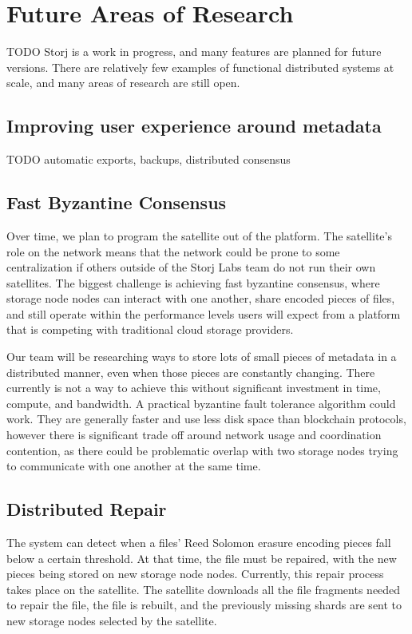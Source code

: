 \documentclass[a4paper,10pt]{article} \usepackage[utf8]{inputenc}
\newcommand{\todo}[1]{{\color{red} TODO #1 }}
\begin{document}
\section{Future Areas of Research}\label{sec:future_work}

\todo{ Storj is a work in progress, and many features are planned for future
versions. There are relatively few examples of functional distributed systems at
scale, and many areas of research are still open. }

\subsection{Improving user experience around metadata}

\todo{automatic exports, backups, distributed consensus}

\subsection{Fast Byzantine Consensus}

Over time, we plan to program the satellite out of the platform. 
The satellite's role on the network means that the network could be prone 
to some
centralization if others outside of the Storj Labs team do not run their own
satellites. The biggest challenge is achieving fast byzantine consensus,
where storage node nodes can interact with one another, share encoded pieces of 
files,
and still operate within the performance levels users will expect from a
platform that is competing with traditional cloud storage providers.

Our team will be researching ways to store lots of small pieces of metadata
in a distributed manner, even when those pieces are constantly changing. There
currently is not a way to achieve this without significant investment in time,
compute, and bandwidth. A practical byzantine fault tolerance algorithm could
work. They are generally faster and use less disk space than blockchain
protocols, however there is significant trade off around network usage and
coordination contention, as there could be problematic overlap with two storage 
nodes trying to communicate with one another at the same time.

\subsection{Distributed Repair}

The system can detect when a files' Reed Solomon erasure encoding pieces fall
below a certain threshold. At that time, the file must be repaired, with 
the new pieces being stored on new storage node nodes. 
Currently, this
repair process takes place on the satellite. The satellite downloads all
the file fragments needed to repair the file, the file is rebuilt, and the
previously missing shards are sent to new storage nodes 
selected by the satellite.
\end{document}
